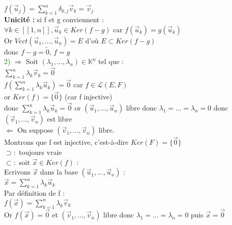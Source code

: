 \documentclass{article}
\begin{document}
$f(\vec u_j)=\sum_{k=1}^n \delta_{k,j} \vec v_k = \vec v_j$ \\
{\bf Unicité :} si f et g conviennent : \\
$\forall k \in [[1,n]], \vec u_k \in Ker(f-g)$ car $f(\vec u_k)=g(\vec u_k)$ \\
Or $Vect(\vec u_1,..., \vec u_n)=E$ d'où $E \subset Ker(f-g)$  \\
donc $f-g=\tilde{0}$, $f=g$ \\
\textcolor{green}{2)} $\Rightarrow$  Soit $(\lambda_1,..., \lambda_n) \in \mathbb K^n$ tel que :  \\
$\sum_{k=1}^n \lambda_k \vec v_k= \vec 0$ \\
$f(\sum_{k=1}^n \lambda_k \vec u_k)= \vec 0$ car $f \in \mathcal L(E,F)$ \\
or $Ker(f)= \lbrace \vec 0 \rbrace$ (car f injective) \\
donc $\sum_{k=1}^n \lambda_k \vec u_k = \vec 0 $ or $(\vec u_1,..., \vec u_n)$ libre donc $\lambda_1=...=\lambda_n=0$ donc $(\vec v_1,..., \vec v_n)$ est libre \\
$\Leftarrow$ On suppose $(\vec v_1,..., \vec v_n)$ libre. \\
Montrons que f est injective, c'est-à-dire $Ker(F)=\lbrace \vec 0 \rbrace$ \\
$\supset :$ toujours vraie \\
$\subset :$ soit $\vec x \in Ker(f)$ : \\
Ecrivons $\vec x$ dans la base $(\vec u_1,...,\vec u_n)$ : \\
$\vec x=\sum_{k=1}^n \lambda_k \vec u_k$ \\
Par définition de f : \\
$f(\vec x)= \sum_{k=1}^n \lambda_k \vec v_k$ \\
Or $f(\vec x) = \vec 0$ et $(\vec v_1,..., \vec v_n)$ libre donc $\lambda_1=...= \lambda_n=0$ puis $\vec x= \vec 0$
\end{document}
